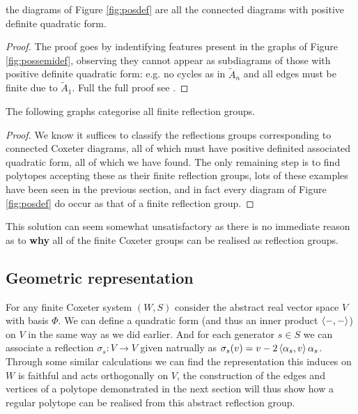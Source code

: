 \documentclass[../main.tex]{subfiles}
\begin{document}
\begin{theorem}
    the diagrams of Figure \ref{fig:posdef} are all the connected diagrams with positive definite quadratic form.
    \begin{proof}
        The proof goes by indentifying features present in the graphs of Figure \ref{fig:possemidef}, observing they cannot appear as subdiagrams of those with positive definite quadratic form: e.g. no cycles as in $\tilde{A}_n$ and all edges must be finite due to $\tilde{A}_1$. Full the full proof see \cite{Humphreys1990}.
    \end{proof}
\end{theorem}

\begin{corollary}
    The following graphs categorise all finite reflection groups.
    \begin{proof}
        We know it suffices to classify the reflections groups corresponding to connected Coxeter diagrams, all of which must have positive definited associated quadratic form, all of which we have found. The only remaining step is to find polytopes accepting these as their finite reflection groups, lots of these examples have been seen in the previous section, and in fact every diagram of Figure \ref{fig:posdef} do occur as that of a finite reflection group.
    \end{proof}
\end{corollary}

This solution can seem somewhat unsatisfactory as there is no immediate reason as to \textbf{why} all of the finite Coxeter groups can be realised as reflection groups.

\subsection{Geometric representation}

For any finite Coxeter system $(W,S)$ consider the abstract real vector space $V$ with basis $\Phi$. We can define a quadratic form (and thus an inner product  $\left\langle -,- \right\rangle$) on $V$ in the same way as we did earlier. And for each generator $s\in S$ we can associate a reflection $\sigma_s:V\rightarrow V$ given natrually as $\sigma_s (v) = v-2\left\langle \alpha_s,v \right\rangle\alpha_s$. Through some similar calculations we can find the representation this induces on $W$ is faithful and acts orthogonally on $V$, the construction of the edges and vertices of a polytope demonstrated in the next section will thus show how a regular polytope can be realised from this abstract reflection group.
\end{document}
